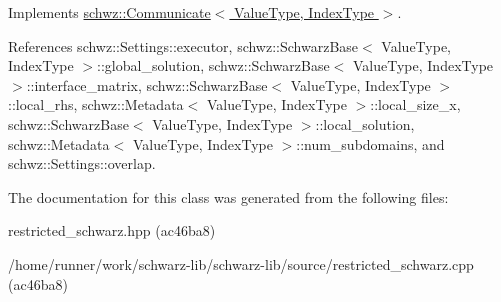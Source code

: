 Implements \hyperlink{classschwz_1_1Communicate_aa1332376dfc67f5384527be90df7cbea}{schwz\+::\+Communicate$<$ Value\+Type, Index\+Type $>$}.



References schwz\+::\+Settings\+::executor, schwz\+::\+Schwarz\+Base$<$ Value\+Type, Index\+Type $>$\+::global\+\_\+solution, schwz\+::\+Schwarz\+Base$<$ Value\+Type, Index\+Type $>$\+::interface\+\_\+matrix, schwz\+::\+Schwarz\+Base$<$ Value\+Type, Index\+Type $>$\+::local\+\_\+rhs, schwz\+::\+Metadata$<$ Value\+Type, Index\+Type $>$\+::local\+\_\+size\+\_\+x, schwz\+::\+Schwarz\+Base$<$ Value\+Type, Index\+Type $>$\+::local\+\_\+solution, schwz\+::\+Metadata$<$ Value\+Type, Index\+Type $>$\+::num\+\_\+subdomains, and schwz\+::\+Settings\+::overlap.



The documentation for this class was generated from the following files\+:\begin{DoxyCompactItemize}
\item 
restricted\+\_\+schwarz.\+hpp (ac46ba8)\item 
/home/runner/work/schwarz-\/lib/schwarz-\/lib/source/restricted\+\_\+schwarz.\+cpp (ac46ba8)\end{DoxyCompactItemize}
